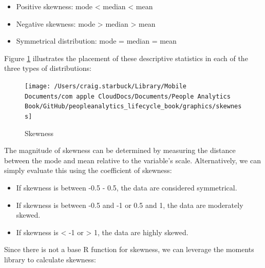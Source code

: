 \documentclass[]{book}
\newenvironment{Shaded}{\begin{snugshade}}{\end{snugshade}}
\newcommand{\CommentTok}[1]{\textcolor[rgb]{0.56,0.35,0.01}{\textit{#1}}}
\newcommand{\DecValTok}[1]{\textcolor[rgb]{0.00,0.00,0.81}{#1}}
\newcommand{\KeywordTok}[1]{\textcolor[rgb]{0.13,0.29,0.53}{\textbf{#1}}}
\newcommand{\NormalTok}[1]{#1}
\newcommand{\OperatorTok}[1]{\textcolor[rgb]{0.81,0.36,0.00}{\textbf{#1}}}
\providecommand{\tightlist}{%
  \setlength{\itemsep}{0pt}\setlength{\parskip}{0pt}}
\begin{document}
\begin{itemize}
\tightlist
\item
  Positive skewness: mode \textless{} median \textless{} mean
\item
  Negative skewness: mode \textgreater{} median \textgreater{} mean
\item
  Symmetrical distribution: mode = median = mean
\end{itemize}

Figure \ref{fig:skewness} illustrates the placement of these descriptive statistics in each of the three types of distributions:

\begin{figure}

{\centering \texttt{[image: /Users/craig.starbuck/Library/Mobile Documents/com~apple~CloudDocs/Documents/People Analytics Book/GitHub/peopleanalytics\_lifecycle\_book/graphics/skewness]} 

}

\caption{Skewness}\label{fig:skewness}
\end{figure}

The magnitude of skewness can be determined by measuring the distance between the mode and mean relative to the variable's scale. Alternatively, we can simply evaluate this using the coefficient of skewness:

\begin{itemize}
\tightlist
\item
  If skewness is between -0.5 - 0.5, the data are considered symmetrical.
\item
  If skewness is between -0.5 and -1 or 0.5 and 1, the data are moderately skewed.
\item
  If skewness is \textless{} -1 or \textgreater{} 1, the data are highly skewed.
\end{itemize}

Since there is not a base R function for skewness, we can leverage the moments library to calculate skewness:

\begin{Shaded}
\end{Shaded}
\end{document}
